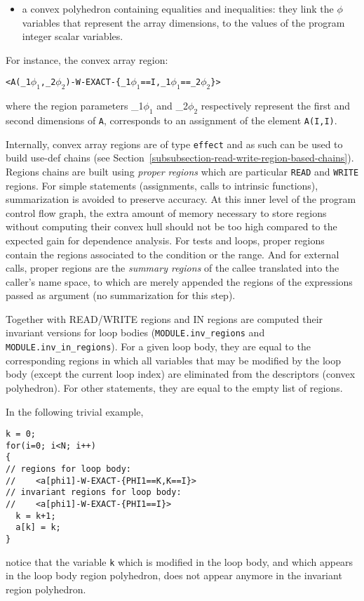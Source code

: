 \documentclass[a4paper]{report}
\newenvironment{PipsPass}[1]{\label{pass:#1}}{}
\newcommand{\phik}[1]{\ifmmode\phi_{#1}\else$\phi_{#1}$\fi}
\begin{document}
\begin{PipsPass}{regions}
\begin{itemize}
\item  a convex polyhedron containing equalities and inequalities:
  they link the $\phi$ variables that represent the array dimensions,
  to the values of the program integer scalar variables.
\end{itemize}

For instance, the convex array region:
\begin{alltt}
  \begin{center}
  <A(\phik{1},\phik{2})-W-EXACT-\{\phik{1}==I, \phik{1}==\phik{2}\}>
\end{center}
\end{alltt}
where the region parameters \phik{1} and \phik{2} respectively represent
the first and second dimensions of \verb+A+, corresponds to an assignment
of the element \verb+A(I,I)+.


Internally, convex array regions are of type \texttt{effect} and as such can be used to build
use-def chains (see
Section~\ref{subsubsection-read-write-region-based-chains}). Regions
chains are built using {\em proper regions} which are particular
\verb+READ+ and \verb+WRITE+ regions. For simple statements (assignments,
calls to intrinsic functions), summarization is avoided to preserve
accuracy. At this inner level of the program control flow graph, the extra
amount of memory necessary to store regions without computing their convex
hull should not be too high compared to the expected gain for dependence
analysis. For tests and loops, proper regions contain the regions associated
to the condition or the range. And for external calls, proper regions
are the {\em summary regions} of the callee translated into the caller's name
space, to which are merely appended the regions of the expressions
passed as argument (no summarization for this step).

Together with READ/WRITE regions and IN regions are computed their
invariant versions for loop bodies (\texttt{MODULE.inv\_regions} and
\texttt{MODULE.inv\_in\_regions}). For a given loop body, they are
equal to the corresponding regions in which all variables that may be
modified by the loop body (except the current loop index) are
eliminated from the descriptors (convex polyhedron). For other
statements, they are equal to the empty list of regions.

In the following trivial example,
\begin{lstlisting}
k = 0;
for(i=0; i<N; i++)
{
// regions for loop body:
//    <a[phi1]-W-EXACT-{PHI1==K,K==I}>
// invariant regions for loop body:
//    <a[phi1]-W-EXACT-{PHI1==I}>
  k = k+1;
  a[k] = k;
}
\end{lstlisting}
notice that the variable \lstinline|k| which is modified in the loop
body, and which appears in the loop body region polyhedron, does not appear
anymore in the invariant region polyhedron.


\end{PipsPass}
\end{document}
